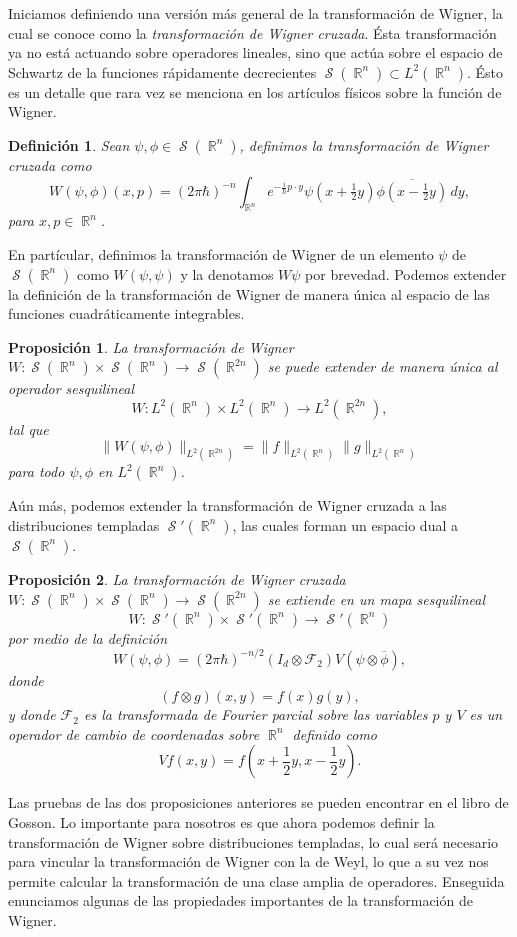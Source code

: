 \documentclass[a4paper]{report}
\DeclareMathOperator{\R}{\mathbb{R}}
\DeclareMathOperator{\Sz}{\mathcal S}
\newtheorem{definition}{Definición}
\newtheorem{proposition}{Proposición}
\begin{document}
  Iniciamos definiendo una versión más general de la
  transformación de Wigner, la cual se conoce como la
  \textit{transformación de Wigner cruzada}. Ésta
  transformación ya no está actuando sobre operadores
  lineales, sino que actúa sobre el espacio de Schwartz de
  la funciones rápidamente decrecientes $\Sz(\R^{n}) \subset
  L^2(\R^{n})$. Ésto es un detalle que rara vez se menciona
  en los artículos físicos sobre la función de Wigner.
  \begin{definition}
    Sean $\psi, \phi \in \Sz(\R^{n})$, definimos la
    transformación de Wigner cruzada como
    \begin{equation}
      \label{eqn:cross_wigner_transform}
      W(\psi,\phi)(x,p)
      = (2\pi\hbar)^{-n} \int_{\R^{n}} e^{-\frac{i}{\hbar} p
      \cdot y} \psi(x + \tfrac{1}{2}y) \overline{\phi(x -
      \tfrac{1}{2}y)} \, dy,
    \end{equation}
    para $x,p \in \R^{n}$.
  \end{definition}
  En partícular, definimos la transformación de Wigner de un
  elemento $\psi$ de $\Sz(\R^{n})$ como $W(\psi,\psi)$ y la
  denotamos $W\psi$ por brevedad. Podemos extender la
  definición de la transformación de Wigner de manera única
  al espacio de las funciones cuadráticamente integrables.
  \begin{proposition}
    La transformación de Wigner $W : \Sz(\R^{n}) \times
    \Sz(\R^{n}) \to \Sz(\R^{2n})$ se puede extender de
    manera única al operador sesquilineal
    \[
      W : L^2(\R^{n}) \times L^2(\R^{n}) \to L^2(\R^{2n}),
    \] 
    tal que
    \[
      \|W(\psi,\phi)\|_{L^2(\R^{2n})}
      = \|f\|_{L^2(\R^{n})} \|g\|_{L^2(\R^{n})}
    \] 
    para todo $\psi, \phi$ en  $L^2(\R^{n})$.
  \end{proposition}
  Aún más, podemos extender la transformación de Wigner
  cruzada a las distribuciones templadas $\Sz'(\R^{n})$, las
  cuales forman un espacio dual a $\Sz(\R^{n})$.
  \begin{proposition}
    La transformación de Wigner cruzada $W : \Sz(\R^{n})
    \times \Sz(\R^{n}) \to \Sz(\R^{2n})$ se extiende en un
    mapa sesquilineal
    \[
      W : \Sz'(\R^{n}) \times \Sz'(\R^{n}) \to \Sz'(\R^{n})
    \] 
    por medio de la definición
    \[
      W(\psi,\phi)
      = (2\pi\hbar)^{-n / 2} (I_d \otimes \mathcal F_2)
      V(\psi \otimes \overline{\phi}),
    \] 
    donde
    \[
      (f \otimes g)(x,y) = f(x)g(y),
    \] 
    y donde $\mathcal F_2$ es la transformada de Fourier
    parcial sobre las variables $p$ y $V$ es un operador de
    cambio de coordenadas sobre $\R^{n}$ definido como
    \[
      Vf(x,y) = f\left( x + \frac{1}{2}y, x - \frac{1}{2}y
      \right).
    \] 
  \end{proposition}
  Las pruebas de las dos proposiciones anteriores se pueden
  encontrar en el libro de Gosson. Lo importante para
  nosotros es que ahora podemos definir la transformación de
  Wigner sobre distribuciones templadas, lo cual será
  necesario para vincular la transformación de Wigner con la
  de Weyl, lo que a su vez nos permite calcular la
  transformación de una clase amplia de operadores.
  Enseguida enunciamos algunas de las propiedades
  importantes de la transformación de Wigner. 
\end{document}
